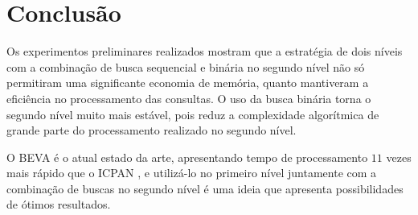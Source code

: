 \section{Conclusão}
\label{sec:conclusion}

Os experimentos preliminares realizados mostram que a estratégia de dois níveis com a combinação de busca sequencial e binária no segundo nível não só permitiram uma significante economia de memória, quanto mantiveram a eficiência no processamento das consultas. O uso da busca binária torna o segundo nível muito mais estável, pois reduz a complexidade algorítmica de grande parte do processamento realizado no segundo nível.

O BEVA é o atual estado da arte, apresentando tempo de processamento $11$ vezes mais rápido que o ICPAN \citep{zhou2016beva}, e utilizá-lo no primeiro nível juntamente com a combinação de buscas no segundo nível é uma ideia que apresenta possibilidades de ótimos resultados.